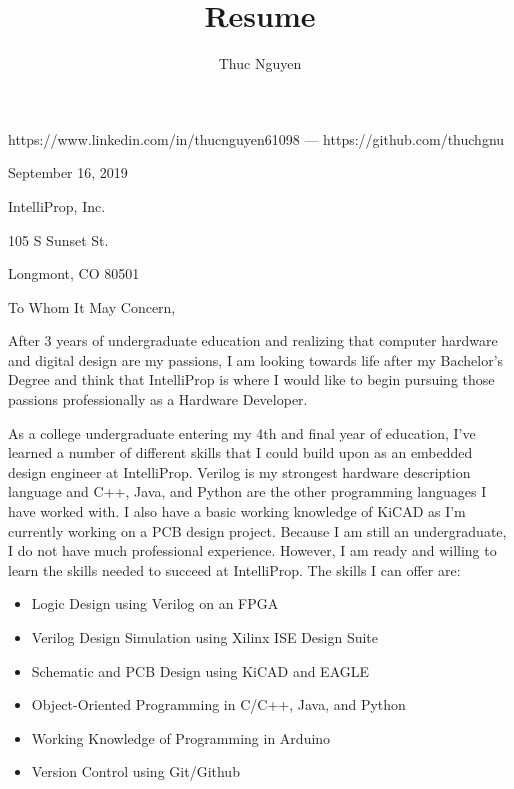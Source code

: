 \documentclass{article}
\renewcommand{\maketitle}
{\begin{center}
{\huge\bfseries\theauthor}
\vspace{.5em}

https://www.linkedin.com/in/thucnguyen61098 --- https://github.com/thuchgnu

\end{center}}
\begin{document}
\title{Resume}
\author{Thuc Nguyen}
\maketitle
\vspace{-.5em}

\begin{flushleft}
\vspace{1.6em}

September 16, 2019

\vspace{1.6em}
IntelliProp, Inc.

105 S Sunset St.

Longmont, CO 80501

\end{flushleft}
\vspace{1.6em}
To Whom It May Concern,

\vspace{1em}
After 3 years of undergraduate education and realizing that computer hardware and digital design are my passions, I am looking towards life after my Bachelor's Degree and think that IntelliProp is where I would like to begin pursuing those passions professionally as a Hardware Developer.

\vspace{.6em}
As a college undergraduate entering my 4th and final year of education, I've learned a number of different skills that I could build upon as an embedded design engineer at IntelliProp. Verilog is my strongest hardware description language and C++, Java, and Python are the other programming languages I have worked with. I also have a basic working knowledge of KiCAD as I'm currently working on a PCB design project. Because I am still an undergraduate, I do not have much professional experience. However, I am ready and willing to learn the skills needed to succeed at IntelliProp. The skills I can offer are:

\begin{itemize}
  \item{Logic Design using Verilog on an FPGA}
  \item{Verilog Design Simulation using Xilinx ISE Design Suite}
  \item{Schematic and PCB Design using KiCAD and EAGLE}
  \item{Object-Oriented Programming in C/C++, Java, and Python}
  \item{Working Knowledge of Programming in Arduino}
  \item{Version Control using Git/Github}
\end{itemize}
\end{document}
